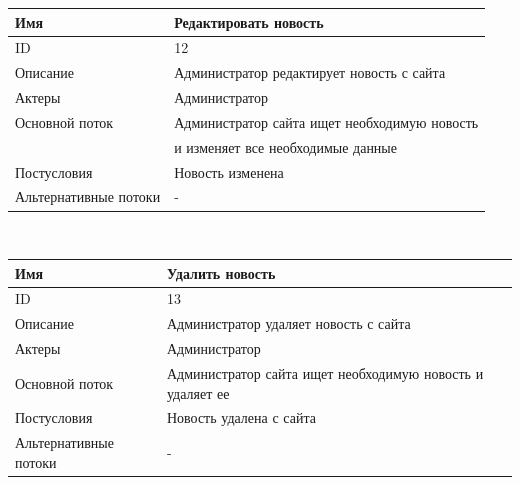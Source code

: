 \newpage
\BgThispage
\begin{center}
\begin{tabular}{|l|l|}
    \hline
    Имя                   & Редактировать новость                        \\
    \hline
    ID                    & 12                                           \\
    \hline
    Описание              & Администратор редактирует новость с сайта    \\
    \hline
    Актеры                & Администратор                                \\
    \hline
    Основной поток        & Администратор сайта ищет необходимую новость \\
    & и изменяет все необходимые данные            \\
    \hline
    Постусловия           & Новость изменена                             \\
    \hline
    Альтернативные потоки & -                                            \\
    \hline
\end{tabular}\\
\vspace{0.8cm}
\begin{tabular}{|l|l|}
    \hline
    Имя                   & Удалить новость                                           \\
    \hline
    ID                    & 13                                                        \\
    \hline
    Описание              & Администратор удаляет новость с сайта                     \\
    \hline
    Актеры                & Администратор                                             \\
    \hline
    Основной поток        & Администратор сайта ищет необходимую новость и удаляет ее \\
    \hline
    Постусловия           & Новость удалена с сайта                                   \\
    \hline
    Альтернативные потоки & -                                                         \\
    \hline
\end{tabular}\\
\end{center}
